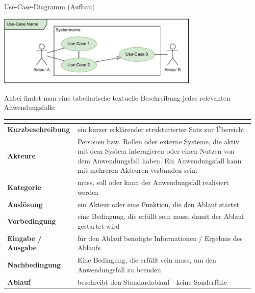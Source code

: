 \begin{defi}{Use-Case-Diagramm (Aufbau)}
    \begin{center}
        \includegraphics[width=0.75\textwidth]{includes/figures/defi_diagrams_use_case_intro.pdf}
    \end{center}

    Anbei findet man eine tabellarische textuelle Beschreibung jedes relevanten Anwendungsfalls:

    \begin{tabularx}{\textwidth}{|>{\bfseries}l|X|}
        \hline
        \multicolumn{2}{|l|}{Use-Case-Nummer, Use-Case-Name}                                                                                                 \\\hline\hline
        Kurzbeschreibung  & ein kurzer erklärender strukturierter Satz zur Übersicht                                                                         \\\hline
        Akteure           & Personen bzw. Rollen oder externe Systeme, die aktiv mit dem System interagieren oder einen Nutzen von dem Anwendungsfall haben.
        Ein Anwendungsfall kann mit mehreren Akteuren verbunden sein.                                                                                        \\\hline
        Kategorie         & muss, soll oder kann der Anwendungsfall realisiert werden                                                                        \\\hline
        Auslösung         & ein Akteur oder eine Funktion, die den Ablauf startet                                                                            \\\hline
        Vorbedingung      & eine Bedingung, die erfüllt sein muss, damit der Ablauf gestartet wird                                                           \\\hline
        Eingabe / Ausgabe & für den Ablauf benötigte Informationen / Ergebnis des Ablaufs                                                                    \\\hline
        Nachbedingung     & Eine Bedingung, die erfüllt sein muss, um den Anwendungsfall zu beenden                                                          \\\hline
        Ablauf            & beschreibt den Standardablauf - keine Sonderfälle                                                                                \\\hline
    \end{tabularx}
\end{defi}

